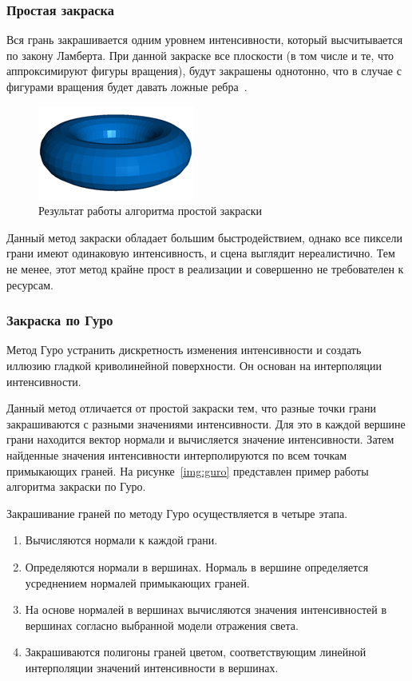 \subsubsection{Простая закраска}

Вся грань закрашивается одним уровнем интенсивности, который высчитывается по закону Ламберта. При данной закраске все плоскости (в том числе и те, что аппроксимируют фигуры вращения), будут закрашены однотонно, что в случае с фигурами вращения будет давать ложные ребра~\cite{roders}.

\begin{figure}[h]
	\centering
	\includegraphics[height=0.15\textheight]{img/simple.png}
	\caption{Результат работы алгоритма простой закраски}
	\label{img:simple-draw}
\end{figure}

Данный метод закраски обладает большим быстродействием, однако все пиксели грани имеют одинаковую интенсивность, и сцена выглядит нереалистично. 
Тем не менее, этот метод крайне прост в реализации и совершенно не требователен к ресурсам.

\subsubsection{Закраска по Гуро}

Метод Гуро устранить дискретность изменения интенсивности и создать иллюзию гладкой криволинейной поверхности.
Он основан на интерполяции интенсивности.

Данный метод отличается от простой закраски тем, что разные точки грани закрашиваются с разными значениями интенсивности.
Для это в каждой вершине грани находится вектор нормали и вычисляется значение интенсивности.
Затем найденные значения интенсивности интерполируются по всем точкам примыкающих граней.
На рисунке~\ref{img:guro} представлен пример работы алгоритма закраски по Гуро.

Закрашивание граней по методу Гуро осуществляется в четыре этапа.
\begin{enumerate}
	\item Вычисляются нормали к каждой грани.
	\item Определяются нормали в вершинах. Нормаль в вершине определяется усреднением нормалей примыкающих граней.
	\item На основе нормалей в вершинах вычисляются значения интенсивностей в вершинах согласно выбранной модели отражения света.
	\item Закрашиваются полигоны граней цветом, соответствующим линейной интерполяции значений интенсивности в вершинах.
\end{enumerate}

